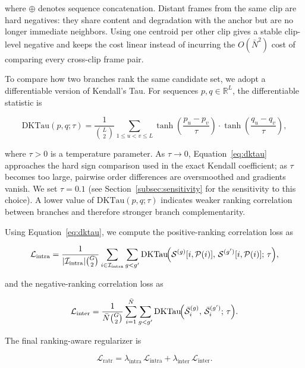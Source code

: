where $\oplus$ denotes sequence concatenation. Distant frames from the same clip are hard negatives: they share content and degradation with the anchor but are no longer immediate neighbors. Using one centroid per other clip gives a stable clip-level negative and keeps the cost linear instead of incurring the $O(\bar{N}^2)$ cost of comparing every cross-clip frame pair.

To compare how two branches rank the same candidate set, we adopt a differentiable version of Kendall's Tau. For sequences $p,q\in\mathbb{R}^{L}$, the differentiable statistic is

\begin{equation}
\mathrm{DKTau}(p,q;\tau)
= \frac{1}{\binom{L}{2}}
\sum_{1\le u < v \le L}
\tanh\!\!\left(\frac{p_u-p_v}{\tau}\right)
\cdot
\tanh\!\!\left(\frac{q_u-q_v}{\tau}\right),
\label{eq:dktau}
\end{equation}

where $\tau>0$ is a temperature parameter. As $\tau\rightarrow 0$, Equation~\eqref{eq:dktau} approaches the hard sign comparison used in the exact Kendall coefficient; as $\tau$ becomes too large, pairwise order differences are oversmoothed and gradients vanish. We set $\tau=0.1$ (see Section~\ref{subsec:sensitivity} for the sensitivity to this choice). A lower value of $\mathrm{DKTau}(p,q;\tau)$ indicates weaker ranking correlation between branches and therefore stronger branch complementarity.

Using Equation~\eqref{eq:dktau}, we compute the positive-ranking correlation loss as

\begin{equation}
\mathcal{L}_{\text{intra}} =
\frac{1}{|\mathcal{I}_{\text{intra}}| \binom{G}{2}}
\sum_{i\in\mathcal{I}_{\text{intra}}}
\sum_{g < g'}
\mathrm{DKTau}\!\Bigl(
\mathcal{S}^{(g)}[i,\mathcal{P}(i)],\,
\mathcal{S}^{(g')}[i,\mathcal{P}(i)];\,\tau
\Bigr),
\label{eq:loss_intra}
\end{equation}

and the negative-ranking correlation loss as

\begin{equation}
\mathcal{L}_{\text{inter}} =
\frac{1}{\bar{N} \binom{G}{2}}
\sum_{i=1}^{\bar{N}}
\sum_{g < g'}
\mathrm{DKTau}\!\Bigl(
\bar{\mathcal{S}}_i^{(g)},\,
\bar{\mathcal{S}}_i^{(g')};\,
\tau
\Bigr).
\end{equation}

The final ranking-aware regularizer is

\begin{equation}
\mathcal{L}_{\text{ratr}} =
\lambda_{\text{intra}}\,\mathcal{L}_{\text{intra}}
+ \lambda_{\text{inter}}\,\mathcal{L}_{\text{inter}}.
\label{eq:loss_ratr}
\end{equation}

